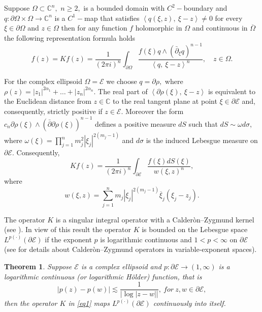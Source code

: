 \documentclass[review]{elsarticle}
\newtheorem{thm}{Theorem}%
\newcommand{\abs}[1]{\left\vert #1 \right\vert}
\newcommand{\scp}[2]{ \left\langle #1,\ #2  \right\rangle }
\newcommand{\C}{\mathbb{C}}
\newcommand{\dom}{\partial\Omega}
\newcommand{\Lp} { L^{p(\cdot)}(\partial\mathcal{E})}
\begin{document}
Suppose $\Omega\subset\C^n,$ $n\geq2,$ is a bounded domain with $C^2-$boundary and $q:\partial\Omega\times\Omega\to\C^n$ is a $C^1-$map that satisfies $\scp{q(\xi,z)}{\xi-z}\neq 0$ for every $\xi\in\partial\Omega$ and $z\in\Omega$ then for any function $f$ holomorphic in $\Omega$ and
continuous in $\overline{\Omega}$ the following representation
formula holds
\begin{equation}
 f(z) = Kf(z)  = \frac{1}{(2\pi i)^n} \int_{\dom}
  \frac{f(\xi) q\wedge(\bar{\partial}_\xi q)^{n-1}}{\scp{q}{\xi-z}^n},\quad
  z\in\Omega.
\end{equation}

For the complex ellipsoid
$\Omega = \mathcal{E}$ we choose $q=\partial\rho,$ where $\rho(z) = \abs{z_1}^{2\alpha_1}+\ldots + \abs{z_n}^{2\alpha_n}.$ The real part of $\scp{\partial\rho(\xi)}{\xi-z}$ is equivalent to the Euclidean distance from $z\in \C$ to the real tangent plane at point $\xi\in\partial \mathcal{E}$ and, consequently, strictly positive if $z\in \mathcal{E}.$ Moreover the form $c_n
\partial\rho(\xi)\wedge(\bar{\partial}\partial\rho(\xi))^{n-1}$ defines a positive measure $dS$ such that $dS\sim \omega d\sigma,$ where
$\omega(\xi)=\prod\limits_{j = 1}^n m_j^2|\xi_j|^{2(m_j-1)}$ and $d\sigma$ is the induced Lebesgue measure on $\partial \mathcal{E}$. 
Consequently, 
\begin{equation}\label{eq1}
	 Kf(z) = \frac{1}{(2\pi i)^n} \int_{\partial\mathcal{E}} \frac{f(\xi) dS(\xi)}{w(\xi,z)^n},
\end{equation}
where
\begin{equation}
w(\xi,z) = \sum\limits_{j=1}^n m_j \abs{\xi_j}^{2(m_j-1)} \overline{\xi}_j (\xi_j-z_j).
\end{equation}

The operator $K$ is a singular integral
operator with a Calder\`{o}n--Zygmund kernel (see \cite{HA99}). 
In view of this result the operator $K$ is
bounded on the Lebesgue space $\Lp$ if the exponent $p$ is logarithmic
continuous and $1<p<\infty$ on $\partial \mathcal{E}$ (see \cite{DHHR11} for details
about Calder\`{o}n--Zygmund operators in variable-exponent spaces).

\begin{thm}
 Suppose $\mathcal{E}$ is a complex ellipsoid and $p:\partial \mathcal{E}\to (1,\infty)$
 is a logarithmic continuous (or logarithmic H\"{o}lder) function, that
 is
\begin{equation} \label{logCont}
  |p(z)-p(w)|\lesssim\frac{1}{ |\log{|z-w|}| },\ \textit{for}\ z,w\in\partial \mathcal{E},
\end{equation}
 then the operator $K$ in \eqref{eq1} maps $\Lp$ continuously into itself.
 \end{thm}
 
\end{document}
